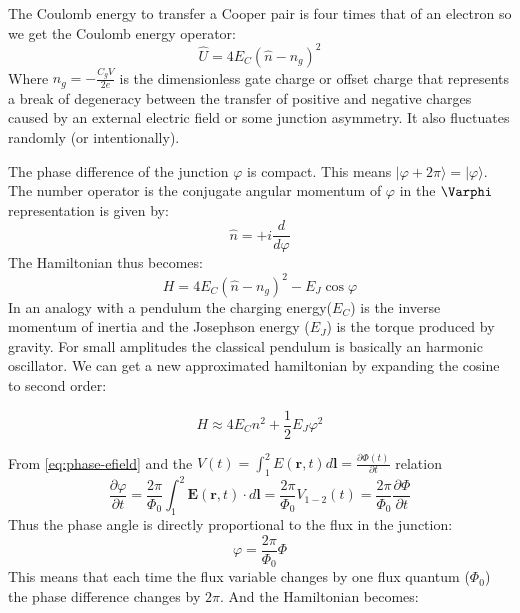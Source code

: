 \documentclass[12pt]{article}
\numberwithin{equation}{subsection}
\newcommand\page[1]{
{
}
}
\begin{document}
The Coulomb energy to transfer a Cooper pair is four times that of an electron so we get the Coulomb energy operator:
\begin{equation}
    \hat U = 4E_C(\hat n - n_g)^2
\end{equation}
Where $n_g = -\frac{C_gV}{2e}$ is the dimensionless gate charge or offset charge that represents a break of degeneracy between the transfer of positive and negative charges caused by an external electric field or some junction asymmetry. It also fluctuates randomly (or intentionally). 
\page{48}
The phase difference of the junction $\varphi$ is compact. This means $|\varphi+2\pi \rangle = | \varphi \rangle$. The number operator is the conjugate angular momentum of $\varphi$ in the $\Varphi$ representation is given by:
\begin{equation}
    \hat n = +i\frac{d}{d\varphi}
\end{equation}
The Hamiltonian thus becomes:
\begin{equation}
    H = 4E_C(\hat n - n_g)^2 - E_J\cos\varphi
    \label{eq:cpb-h}
\end{equation}
In an analogy with a pendulum the charging energy($E_C$) is the inverse momentum of inertia and the Josephson energy ($E_J$) is the torque produced by gravity. For small amplitudes the classical pendulum is basically an harmonic oscillator. We can get a new approximated hamiltonian by expanding the cosine to second order:
\page{49}
\begin{equation}
    H \approx 4E_Cn^2 + \frac{1}{2} E_J \varphi^2
\end{equation}


From \ref{eq:phase-efield} and the $V(t)=\int^2_1E(\mathbf r, t) d\mathbf l=\frac{\partial \Phi(t)}{\partial t}$ relation
\begin{equation}
    \frac{\partial\varphi}{\partial t} = \frac{2\pi}{\Phi_0}\int^2_1\mathbf E (\mathbf r , t) \cdot d\mathbf l = \frac{2\pi}{\Phi_0} V_{1-2}(t) = \frac{2\pi}{\Phi_0} \frac{\partial\Phi}{\partial t} 
\end{equation}
Thus the phase angle is directly proportional to the flux in the junction:
\begin{equation}
    \varphi = \frac{2\pi}{\Phi_0} \Phi
\end{equation}
This means that each time the flux variable changes by one flux quantum ($\Phi_0$) the phase difference changes by $2\pi$. And the Hamiltonian becomes:
\end{document}
